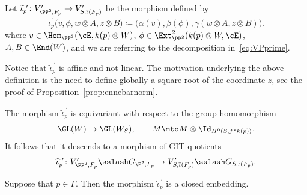 \begin{defi}
Let $\widetilde{\iota}_p^{\ \prime}\colon V_{\PP^2,F_p}'\to V_{S,\overline{\iota}(F_p)}'$ be the morphism defined by
\begin{equation}\label{eq:DefOfIotaTilde2}
\widetilde{\iota}_p^{\ \prime}
\bigl(v,\phi,w\otimes A,z\otimes B\bigr) \coloneqq \bigl(\alpha(v),\beta(\phi), \gamma(w\otimes A,z\otimes B)\bigr).
\end{equation}
where $v\in\Hom_{\PP^2}(\cE,k(p)\otimes W)$, $\phi\in\Ext^2_{\PP^2}(k(p)\otimes W,\cE)$, $A,B\in\End(W)$, and we are referring
to the decomposition in~\eqref{eq:VPprime}.
\end{defi}

Notice that $\widetilde{\iota}_p^{\ \prime}$ is affine and not linear.
The motivation underlying the above definition is the need to define globally a square root of the coordinate $z$, see the proof of Proposition~\ref{prop:ennebarnorm}.

The morphism $\widetilde{\iota}_p^{\ \prime}$ is equivariant with respect to the group homomorphism
\[
\GL(W) \to \GL(W_S), \qquad M\mto M\otimes\Id_{H^0(S,f^*k(p))}.
\]
It follows that it descends to a morphism of GIT quotients
\[
\widehat{\iota}_p^{\ \prime}\colon V_{\PP^2,F_p}'\sslash G_{\P^2,F_p} \to V_{S,\overline{\iota}(F_p)}'\sslash G_{S,\overline{\iota}(F_p)}.
\]

\begin{lemm}\label{lem:PointIsInGamma}
Suppose that $p\in\mathsf{\Gamma}$.
Then the morphism $\widehat{\iota}_p^{\ \prime}$ is a closed embedding.
\end{lemm}

